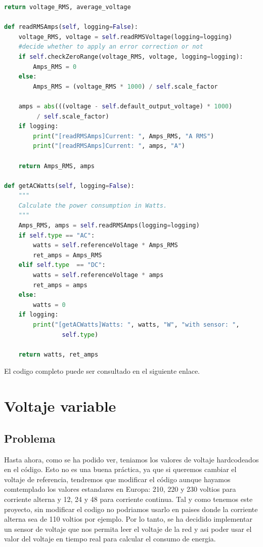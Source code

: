 \begin{titlepage}
\begin{lstlisting}[language=python]
	return voltage_RMS, average_voltage

def readRMSAmps(self, logging=False):
	voltage_RMS, voltage = self.readRMSVoltage(logging=logging)
	#decide whether to apply an error correction or not
	if self.checkZeroRange(voltage_RMS, voltage, logging=logging):
		Amps_RMS = 0
	else:
		Amps_RMS = (voltage_RMS * 1000) / self.scale_factor

	amps = abs(((voltage - self.default_output_voltage) * 1000)
		 / self.scale_factor)
	if logging:
		print("[readRMSAmps]Current: ", Amps_RMS, "A RMS")
		print("[readRMSAmps]Current: ", amps, "A")

	return Amps_RMS, amps

def getACWatts(self, logging=False):
	"""
	Calculate the power consumption in Watts.
	"""
	Amps_RMS, amps = self.readRMSAmps(logging=logging)
	if self.type == "AC":
		watts = self.referenceVoltage * Amps_RMS
		ret_amps = Amps_RMS
	elif self.type  == "DC":
		watts = self.referenceVoltage * amps
		ret_amps = amps
	else:
		watts = 0
	if logging:
		print("[getACWatts]Watts: ", watts, "W", "with sensor: ", 
				self.type)

	return watts, ret_amps

\end{lstlisting}

El codigo completo puede ser consultado en el siguiente enlace\cite{ref23}.\\


\section {Voltaje variable}
\subsection{Problema}
Hasta ahora, como se ha podido ver, teniamos los valores de voltaje hardcodeados en el código. Esto no es una buena práctica, ya que si queremos cambiar el voltaje de referencia, tendremos que modificar el código aunque hayamos comtemplado los valores estandares en Europa: 210, 220 y 230 voltios para corriente alterna y 12, 24 y 48 para corriente continua. Tal y como tenemos este proyecto, sin modificar el codigo no podriamos usarlo en paises donde la corriente alterna sea de 110 voltios por ejemplo. Por lo tanto, se ha decidido implementar un sensor de voltaje que nos permita leer el voltaje de la red y asi poder usar el valor del voltaje en tiempo real para calcular el consumo de energia.\\


\end{titlepage}
